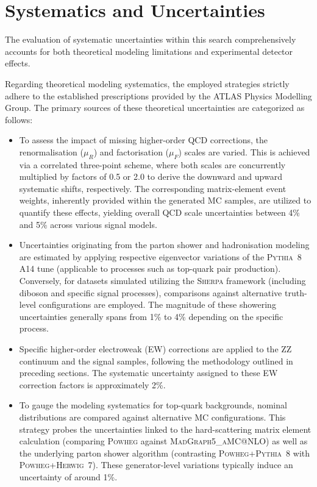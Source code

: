 \section{Systematics and Uncertainties}
\label{sec:monoZ-syst}

The evaluation of systematic uncertainties within this search comprehensively accounts for both theoretical modeling limitations and experimental detector effects.

Regarding theoretical modeling systematics, the employed strategies strictly adhere to the established prescriptions provided by the ATLAS Physics Modelling Group. The primary sources of these theoretical uncertainties are categorized as follows:
\begin{itemize}

\item To assess the impact of missing higher-order QCD corrections, the renormalisation ($\mu_R$) and factorisation ($\mu_F$) scales are varied. This is achieved via a correlated three-point scheme, where both scales are concurrently multiplied by factors of 0.5 or 2.0 to derive the downward and upward systematic shifts, respectively. The corresponding matrix-element event weights, inherently provided within the generated MC samples, are utilized to quantify these effects, yielding overall QCD scale uncertainties between 4\% and 5\% across various signal models.

\item Uncertainties originating from the parton shower and hadronisation modeling are estimated by applying respective eigenvector variations of the \textsc{Pythia}~8 A14 tune (applicable to processes such as top-quark pair production). Conversely, for datasets simulated utilizing the \textsc{Sherpa} framework (including diboson and specific signal processes), comparisons against alternative truth-level configurations are employed. The magnitude of these showering uncertainties generally spans from 1\% to 4\% depending on the specific process.

\item Specific higher-order electroweak (EW) corrections are applied to the $\text{ZZ}$ continuum and the signal samples, following the methodology outlined in preceding sections. The systematic uncertainty assigned to these EW correction factors is approximately 2\%.

\item To gauge the modeling systematics for top-quark backgrounds, nominal distributions are compared against alternative MC configurations. This strategy probes the uncertainties linked to the hard-scattering matrix element calculation (comparing \textsc{Powheg} against \textsc{MadGraph5\_aMC@NLO}) as well as the underlying parton shower algorithm (contrasting \textsc{Powheg}+\textsc{Pythia}~8 with \textsc{Powheg}+\textsc{Herwig}~7). These generator-level variations typically induce an uncertainty of around 1\%.


\end{itemize}
